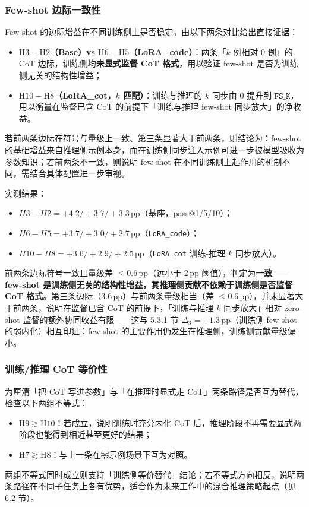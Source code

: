 \subsubsection{Few-shot 边际一致性}
Few-shot 的边际增益在不同训练侧上是否稳定，由以下两条对比给出直接证据：
\begin{itemize}
    \item \textbf{$\mathrm{H3} - \mathrm{H2}$（Base）vs $\mathrm{H6} - \mathrm{H5}$（LoRA\_code）}：两条「$k$ 例相对 $0$ 例」的 CoT 边际，训练侧均\textbf{未显式监督 CoT 格式}，用以验证 few-shot 是否为训练侧无关的结构性增益；
    \item \textbf{$\mathrm{H10} - \mathrm{H8}$（LoRA\_cot，$k$ 匹配）}：训练与推理的 $k$ 同步由 $0$ 提升到 $\texttt{FS\_K}$，用以衡量在监督已含 CoT 的前提下「训练与推理 few-shot 同步放大」的净收益。
\end{itemize}
若前两条边际在符号与量级上一致、第三条显著大于前两条，则结论为：few-shot 的基础增益来自推理侧示例本身，而在训练侧同步注入示例可进一步被模型吸收为参数知识；若前两条不一致，则说明 few-shot 在不同训练侧上起作用的机制不同，需结合具体配置进一步审视。

实测结果：
\begin{itemize}
    \item $H3-H2 = +4.2 / +3.7 / +3.3$\,pp（基座，pass@1/5/10）；
    \item $H6-H5 = +3.7 / +3.0 / +2.7$\,pp（\texttt{LoRA\_code}）；
    \item $H10-H8 = +3.6 / +2.9 / +2.5$\,pp（\texttt{LoRA\_cot} 训练-推理 $k$ 同步放大）。
\end{itemize}
前两条边际符号一致且量级差 $\le 0.6$\,pp（远小于 2\,pp 阈值），判定为\textbf{一致}——\textbf{few-shot 是训练侧无关的结构性增益，其推理侧贡献不依赖于训练侧是否监督 CoT 格式}。第三条边际（3.6\,pp）与前两条量级相当（差 $\le 0.6$\,pp），并未显著大于前两条，说明在监督已含 CoT 的前提下，「训练与推理 $k$ 同步放大」相对 zero-shot 监督的额外协同收益有限——这与 5.3.1 节 $\Delta_3=+1.3$\,pp（训练侧 few-shot 的弱内化）相互印证：few-shot 的主要作用仍发生在推理侧，训练侧贡献量级偏小。

\subsubsection{训练/推理 CoT 等价性}
为厘清「把 CoT 写进参数」与「在推理时显式走 CoT」两条路径是否互为替代，检查以下两组不等式：
\begin{itemize}
    \item $\mathrm{H9} \gtrsim \mathrm{H10}$：若成立，说明训练时充分内化 CoT 后，推理阶段不再需要显式两阶段也能得到相近甚至更好的结果；
    \item $\mathrm{H7} \gtrsim \mathrm{H8}$：与上一条在零示例场景下互为对照。
\end{itemize}
两组不等式同时成立则支持「训练侧等价替代」结论；若不等式方向相反，说明两条路径在不同子任务上各有优势，适合作为未来工作中的混合推理策略起点（见 6.2 节）。

